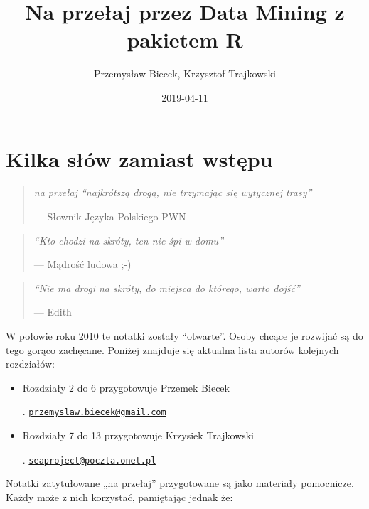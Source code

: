 \documentclass[polish,]{book}
\title{Na przełaj przez Data Mining z pakietem R}
\author{Przemysław Biecek, Krzysztof Trajkowski}
\date{2019-04-11}
\begin{document}
\maketitle

{
\hypersetup{linkcolor=black}
\setcounter{tocdepth}{2}
\tableofcontents
}
\hypertarget{part_1}{%
\chapter{Kilka słów zamiast wstępu}\label{part_1}}

\begin{quote}
\emph{na przełaj ``najkrótszą drogą, nie trzymając się wytycznej trasy''}

--- Słownik Języka Polskiego PWN
\end{quote}

\begin{quote}
\emph{``Kto chodzi na skróty, ten nie śpi w domu''}

--- Mądrość ludowa ;-)
\end{quote}

\begin{quote}
\emph{``Nie ma drogi na skróty, do miejsca do którego, warto dojść''}

--- Edith
\end{quote}

W połowie roku 2010 te notatki zostały ``otwarte''. Osoby chcące je rozwijać
są do tego gorąco zachęcane. Poniżej znajduje się aktualna lista autorów kolejnych
rozdziałów:

\begin{itemize}
\item
  Rozdziały 2 do 6 przygotowuje Przemek Biecek

  . \href{mailto:przemyslaw.biecek@gmail.com}{\nolinkurl{przemyslaw.biecek@gmail.com}}
\item
  Rozdziały 7 do 13 przygotowuje Krzysiek Trajkowski

  . \href{mailto:seaproject@poczta.onet.pl}{\nolinkurl{seaproject@poczta.onet.pl}}
\end{itemize}

Notatki zatytułowane „na przełaj'' przygotowane są jako materiały pomocnicze.
Każdy może z nich korzystać, pamiętając jednak że:
\end{document}
